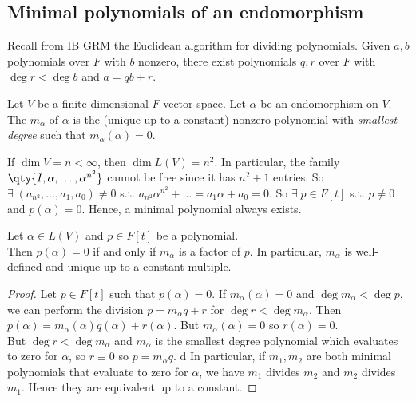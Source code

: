 \subsection{Minimal polynomials of an endomorphism}
Recall from IB GRM the Euclidean algorithm for dividing polynomials.
Given $a, b$ polynomials over $F$ with $b$ nonzero, there exist polynomials $q, r$ over $F$ with $\deg r < \deg b$ and $a = qb + r$.
\begin{definition}
	Let $V$ be a finite dimensional $F$-vector space.
	Let $\alpha$ be an endomorphism on $V$. \\
	The  $m_\alpha$ of $\alpha$ is the (unique up to a constant) nonzero polynomial with \textit{smallest degree} such that $m_\alpha(\alpha) = 0$.
\end{definition}
\begin{remark}
	If $\dim V = n < \infty$, then $\dim L(V) = n^2$.
	In particular, the family $\qty{I, \alpha, \dots, \alpha^{n^2}}$ cannot be free since it has $n^2+1$ entries.
	So $\exists \; (a_{n^2}, \dots, a_1, a_0) \neq 0$ s.t. $a_{n^2} \alpha^{n^2} + \dots = a_1 \alpha + a_0 = 0$.
	So $\exists \; p \in F[t]$ s.t. $p \neq 0$ and $p(\alpha) = 0$.
	Hence, a minimal polynomial always exists.
\end{remark}
\begin{lemma}
	Let $\alpha \in L(V)$ and $p \in F[t]$ be a polynomial. \\
	Then $p(\alpha) = 0$ if and only if $m_\alpha$ is a factor of $p$.
	In particular, $m_\alpha$ is well-defined and unique up to a constant multiple.
\end{lemma}
\begin{proof}
	Let $p \in F[t]$ such that $p(\alpha) = 0$.
	If $m_\alpha(\alpha) = 0$ and $\deg m_\alpha < \deg p$, we can perform the division $p = m_\alpha q + r$ for $\deg r < \deg m_\alpha$.
	Then $p(\alpha) = m_\alpha(\alpha) q(\alpha) + r(\alpha)$.
	But $m_\alpha(\alpha) = 0$ so $r(\alpha) = 0$. \\
	But $\deg r < \deg m_\alpha$ and $m_\alpha$ is the smallest degree polynomial which evaluates to zero for $\alpha$, so $r \equiv 0$ so $p = m_\alpha q$.
	d
	In particular, if $m_1, m_2$ are both minimal polynomials that evaluate to zero for $\alpha$, we have $m_1$ divides $m_2$ and $m_2$ divides $m_1$.
	Hence they are equivalent up to a constant.
\end{proof}
